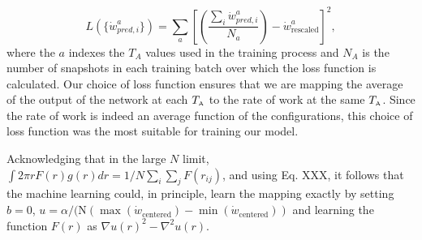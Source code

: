 \documentclass[superscriptaddress, amsmath,preprintnumbers,10pt,article,notitlepage]{revtex4-1}
\newcommand{\A}{\text{\tiny{A}}}
\begin{document}
\begin{equation}
     L(\{\dot{w}^a_{pred, i}\}) = \sum_a \left[  \left( \dfrac{\sum_i \dot{w}^a_{pred, i}}{N_a} \right) - \dot{w}^a_{\text{rescaled}} \right]^2,
\end{equation}
where the $a$ indexes the $T_A$ values used in the training process and $N_A$ is the number of snapshots in each training batch over which the loss function is calculated. Our choice of loss function ensures that we are mapping the average of the output of the  network at each $T_\A$ to the rate of work at the same $T_\A$. Since the rate of work is indeed an average function of the configurations, this choice of loss function was the most suitable for training our model.

Acknowledging that in the large $N$ limit, $ \int 2\pi r F(r) g(r) dr = 1/N \sum_i \sum_j F(r_{ij})$, and using Eq. XXX, it follows that the machine learning could, in principle, learn the mapping exactly by setting $b = 0$, $ u = \alpha/(\text{N} (\max(\dot{w}_{\text{centered}}) - \min(\dot{w}_{\text{centered}} ))$ and learning the function $F(r)$ as $\nabla u(r)^2 - \nabla^2 u(r)$.



\end{document}
